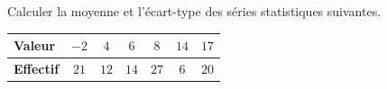 \begin{exo}
	Calculer la moyenne et l'écart-type des séries statistiques suivantes.

	\begin{center}
		\def\arraystretch{1.4}
		\begin{tabular}{|l|c|c|c|c|c|c|} \hline
			\textbf{Valeur}   & $-2$ & $4$  & $6$  & $8$  & $14$ & $17$ \\ \hline
			\textbf{Effectif} & $21$ & $12$ & $14$ & $27$ & $6$  & $20$ \\ \hline
		\end{tabular}
	\end{center}
\end{exo}

